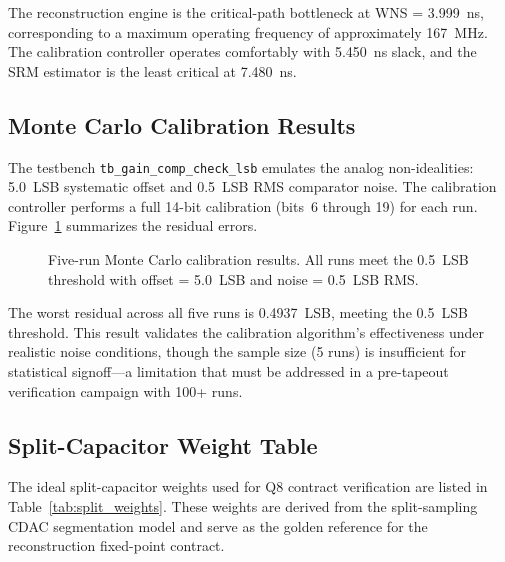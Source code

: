 \documentclass[journal]{IEEEtran}
\begin{document}
The reconstruction engine is the critical-path bottleneck at WNS = 3.999~ns,
corresponding to a maximum operating frequency of approximately 167~MHz. The
calibration controller operates comfortably with 5.450~ns slack, and the SRM
estimator is the least critical at 7.480~ns.

\subsection{Monte Carlo Calibration Results}

The testbench \texttt{tb\_gain\_comp\_check\_lsb} emulates the analog
non-idealities: 5.0~LSB systematic offset and 0.5~LSB RMS comparator noise.
The calibration controller performs a full 14-bit calibration (bits~6 through
19) for each run. Figure~\ref{fig:mc_results} summarizes the residual errors.

\begin{figure}[!t]
\centering
{}
\caption{Five-run Monte Carlo calibration results. All runs meet the 0.5~LSB
threshold with offset = 5.0~LSB and noise = 0.5~LSB RMS.}
\label{fig:mc_results}
\end{figure}

The worst residual across all five runs is 0.4937~LSB, meeting the 0.5~LSB
threshold. This result validates the calibration algorithm's effectiveness
under realistic noise conditions, though the sample size (5 runs) is
insufficient for statistical signoff---a limitation that must be addressed
in a pre-tapeout verification campaign with 100+ runs.

\subsection{Split-Capacitor Weight Table}

The ideal split-capacitor weights used for Q8 contract verification are
listed in Table~\ref{tab:split_weights}. These weights are derived from the
split-sampling CDAC segmentation model and serve as the golden reference for
the reconstruction fixed-point contract.
\end{document}
